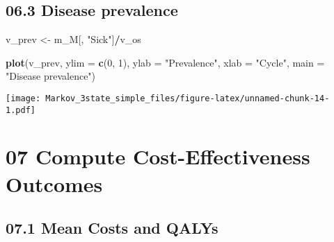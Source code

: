 \documentclass[
]{article}
\newenvironment{Shaded}{\begin{snugshade}}{\end{snugshade}}
\newcommand{\CommentTok}[1]{\textcolor[rgb]{0.56,0.35,0.01}{\textit{#1}}}
\newcommand{\DataTypeTok}[1]{\textcolor[rgb]{0.13,0.29,0.53}{#1}}
\newcommand{\DecValTok}[1]{\textcolor[rgb]{0.00,0.00,0.81}{#1}}
\newcommand{\KeywordTok}[1]{\textcolor[rgb]{0.13,0.29,0.53}{\textbf{#1}}}
\newcommand{\NormalTok}[1]{#1}
\newcommand{\OperatorTok}[1]{\textcolor[rgb]{0.81,0.36,0.00}{\textbf{#1}}}
\newcommand{\StringTok}[1]{\textcolor[rgb]{0.31,0.60,0.02}{#1}}
\begin{document}
\hypertarget{disease-prevalence}{%
\subsection{06.3 Disease prevalence}\label{disease-prevalence}}

\begin{Shaded}
\begin{Highlighting}[]
\NormalTok{v_prev <-}\StringTok{ }\NormalTok{m_M[, }\StringTok{"Sick"}\NormalTok{]}\OperatorTok{/}\NormalTok{v_os}

\KeywordTok{plot}\NormalTok{(v_prev,}
     \DataTypeTok{ylim =} \KeywordTok{c}\NormalTok{(}\DecValTok{0}\NormalTok{, }\DecValTok{1}\NormalTok{),}
     \DataTypeTok{ylab =} \StringTok{"Prevalence"}\NormalTok{,}
     \DataTypeTok{xlab =} \StringTok{"Cycle"}\NormalTok{,}
     \DataTypeTok{main =} \StringTok{"Disease prevalence"}\NormalTok{)}
\end{Highlighting}
\end{Shaded}

\texttt{[image: Markov\_3state\_simple\_files/figure-latex/unnamed-chunk-14-1.pdf]}

\hypertarget{compute-cost-effectiveness-outcomes}{%
\section{07 Compute Cost-Effectiveness
Outcomes}\label{compute-cost-effectiveness-outcomes}}

\hypertarget{mean-costs-and-qalys}{%
\subsection{07.1 Mean Costs and QALYs}\label{mean-costs-and-qalys}}

\begin{Shaded}
\end{Shaded}
\end{document}
